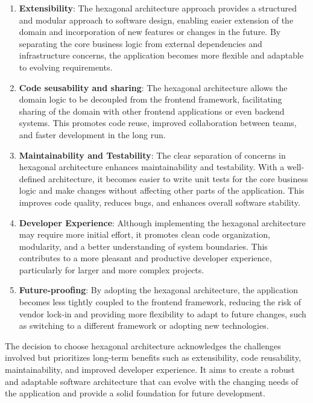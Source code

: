 \documentclass[../design.tex]{subfiles}
\begin{document}
\begin{enumerate}
	\item\textbf{Extensibility}: The hexagonal architecture approach provides a
	structured and modular approach to software design, enabling easier
	extension of the domain and incorporation of new features or changes in
	the future. By separating the core business logic from external
	dependencies and infrastructure concerns, the application becomes more
	flexible and adaptable to evolving requirements.
	\item\textbf{Code seusability and sharing}: The hexagonal architecture
	allows the domain logic to be decoupled from the frontend framework,
	facilitating sharing of the domain with other frontend applications or
	even backend systems. This promotes code reuse, improved collaboration
	between teams, and faster development in the long run.
	\item\textbf{Maintainability and Testability}: The clear separation of
	concerns in hexagonal architecture enhances maintainability and
	testability. With a well-defined architecture, it becomes easier to write
	unit tests for the core business logic and make changes without affecting
	other parts of the application. This improves code quality, reduces bugs,
	and enhances overall software stability.
	\item\textbf{Developer Experience}: Although implementing the hexagonal
	architecture may require more initial effort, it promotes clean code
	organization, modularity, and a better understanding of system boundaries.
	This contributes to a more pleasant and productive developer experience,
	particularly for larger and more complex projects.
	\item\textbf{Future-proofing}: By adopting the hexagonal architecture, the
	application becomes less tightly coupled to the frontend framework, reducing
	the risk of vendor lock-in and providing more flexibility to adapt to future
	changes, such as switching to a different framework or adopting new
	technologies.
\end{enumerate}
The decision to choose hexagonal architecture acknowledges the challenges
involved but prioritizes long-term benefits such as extensibility, code
reusability, maintainability, and improved developer experience. It aims to
create a robust and adaptable software architecture that can evolve with the
changing needs of the application and provide a solid foundation for future
development.
\end{document}
